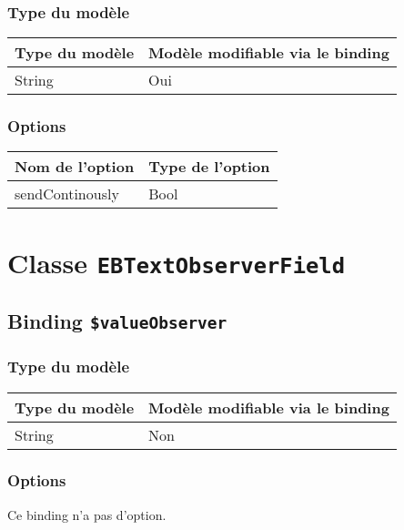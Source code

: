 \subsubsection{Type du modèle}

\begin{tabular}{|l|l|}
\hline
\textbf{Type du modèle} & \textbf{Modèle modifiable via le binding}\\
\hline
String & Oui\\
\hline
\end{tabular}
\subsubsection{Options}

\begin{tabular}{|l|l|}
\hline
\textbf{Nom de l'option} & \textbf{Type de l'option}\\
\hline
sendContinously & Bool\\
\hline
\end{tabular}







\section{Classe \texttt{EBTextObserverField}}

\subsection{Binding \texttt{\$valueObserver}}

\subsubsection{Type du modèle}

\begin{tabular}{|l|l|}
\hline
\textbf{Type du modèle} & \textbf{Modèle modifiable via le binding}\\
\hline
String & Non\\
\hline
\end{tabular}
\subsubsection{Options}

Ce binding n'a pas d'option.









